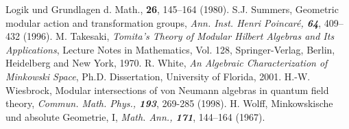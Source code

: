 \documentclass[a4paper,twoside,12pt]{article}
\begin{document}
\begin{thebibliography}{Bor}
{Logik und Grundlagen d. Math., \bf 26}, 145--164 (1980).
S.J. Summers, Geometric modular action and transformation groups,
{\sl Ann. Inst. Henri Poincar\'e, \bf 64}, 409--432 (1996).
M. Takesaki, {\it Tomita's Theory of Modular Hilbert Algebras and 
Its Applications}, Lecture Notes in Mathematics, Vol. 128, Springer-Verlag,
Berlin, Heidelberg and New York, 1970.                       
R. White, {\it An Algebraic Characterization of Minkowski Space}, 
Ph.D. Dissertation, University of Florida, 2001.
H.-W. Wiesbrock, Modular intersections of von Neumann algebras in
quantum field theory, {\sl Commun. Math. Phys., \bf 193}, 269-285 (1998).
H. Wolff, Minkowskische und absolute Geometrie, I, {\sl
Math. Ann., \bf 171}, 144--164 (1967).
\end{thebibliography}
\end{document}
